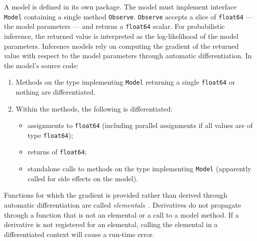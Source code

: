 \documentclass[sigplan,screen]{acmart}
\begin{document}
\begin{sloppypar}
A model is defined in its own package. The model must
implement interface \lstinline{Model} containing a single method
\lstinline{Observe}. \lstinline{Observe} accepts a slice of
\lstinline{float64} --- the model parameters --- and returns a
\lstinline{float64} scalar. For probabilistic inference, the
returned value is interpreted as the log-likelihood of the model
parameters. Inference models rely on computing the gradient of
the returned value with respect to the model parameters through
automatic differentiation. In the model's source code:

\begin{enumerate}
  \item Methods on the type implementing \lstinline{Model} returning a
    single \lstinline{float64} or nothing are differentiated.
  \item Within the methods, the following is differentiated:
    \begin{itemize}
      \item assignments to \lstinline{float64} (including parallel
        assignments if all values are of type
        \lstinline{float64});
      \item returns of \lstinline{float64};
      \item standalone calls to methods on the type implementing
        \lstinline{Model} (apparently called for side  effects on
        the model).
    \end{itemize}
\end{enumerate}

Functions for which the gradient is provided rather than derived
through automatic differentiation are called
\textit{elementals}~\cite{GW08}. Derivatives do not propagate
through a function that is not an elemental or a call to a model
method. If a derivative is not registered for an elemental,
calling the elemental in a differentiated context will cause a
run-time error.


\end{sloppypar}
\end{document}
